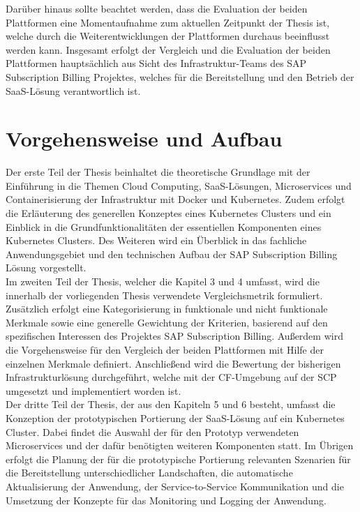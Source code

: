 Darüber hinaus sollte beachtet werden, dass die Evaluation der beiden Plattformen eine Momentaufnahme zum aktuellen Zeitpunkt der Thesis ist, welche durch die Weiterentwicklungen der Plattformen durchaus beeinflusst werden kann. Insgesamt erfolgt der Vergleich und die Evaluation der beiden Plattformen hauptsächlich aus Sicht des Infrastruktur-Teams des SAP Subscription Billing Projektes, welches für die Bereitstellung und den Betrieb der \ac{SaaS}-Lösung verantwortlich ist.

\newpage

\section{Vorgehensweise und Aufbau}
\label{Vorgehensweise}
Der erste Teil der Thesis beinhaltet die theoretische Grundlage mit der Einführung in die Themen Cloud Computing, \ac{SaaS}-Lösungen, Microservices und Containerisierung der Infrastruktur mit Docker und Kubernetes. Zudem erfolgt die Erläuterung des generellen Konzeptes eines Kubernetes Clusters und ein Einblick in die Grundfunktionalitäten der essentiellen Komponenten eines Kubernetes Clusters. Des Weiteren wird ein Überblick in das fachliche Anwendungsgebiet und den technischen Aufbau der SAP Subscription Billing Lösung vorgestellt.\\
Im zweiten Teil der Thesis, welcher die Kapitel 3 und 4 umfasst, wird die innerhalb der vorliegenden Thesis verwendete Vergleichsmetrik formuliert. Zusätzlich erfolgt eine Kategorisierung in funktionale und nicht funktionale Merkmale sowie eine generelle Gewichtung der Kriterien, basierend auf den spezifischen Interessen des Projektes SAP Subscription Billing. Außerdem wird die Vorgehensweise für den Vergleich der beiden Plattformen mit Hilfe der einzelnen Merkmale definiert. Anschließend wird die Bewertung der bisherigen Infrastrukturlösung durchgeführt, welche mit der \ac{CF}-Umgebung auf der \ac{SCP} umgesetzt und implementiert worden ist.\\
Der dritte Teil der Thesis, der aus den Kapiteln 5 und 6 besteht, umfasst die Konzeption der prototypischen Portierung der \ac{SaaS}-Lösung auf ein Kubernetes Cluster. Dabei findet die Auswahl der für den Prototyp verwendeten Microservices und der dafür benötigten weiteren Komponenten statt. Im Übrigen erfolgt die Planung der für die prototypische Portierung relevanten Szenarien für die Bereitstellung unterschiedlicher Landschaften, die automatische Aktualisierung der Anwendung, der Service-to-Service Kommunikation und die Umsetzung der Konzepte für das Monitoring und Logging der Anwendung.\\
